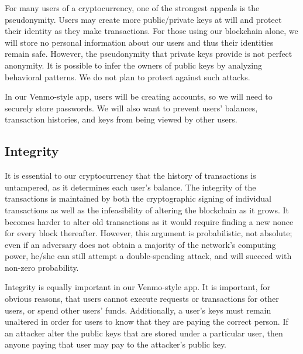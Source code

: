 \documentclass[12pt]{article}
\begin{document}
For many users of a cryptocurrency, one of the strongest appeals is the pseudonymity.
Users may create more public/private keys at will and protect their identity as they make transactions.
For those using our blockchain alone, we will store no personal information about our users and thus their identities remain safe.
However, the pseudonymity that private keys provide is not perfect anonymity. It is possible to infer the owners of public keys by analyzing behavioral patterns. We do not plan to protect against such attacks.

In our Venmo-style app, users will be creating accounts, so we will need to securely store passwords. We will also want to prevent users' balances, transaction histories, and keys from being viewed by other users.

\subsection{Integrity}

It is essential to our cryptocurrency that the history of transactions is untampered, as it determines each user's balance.
The integrity of the transactions is maintained by both the cryptographic signing of individual transactions as well as the infeasibility of altering the blockchain as it grows.
It becomes harder to alter old transactions as it would require finding a new nonce for every block thereafter.
However, this argument is probabilistic, not absolute; even if an adversary does not obtain a majority of the network's computing power, he/she can still attempt a double-spending attack, and will succeed with non-zero probability.

Integrity is equally important in our Venmo-style app.
It is important, for obvious reasons, that users cannot execute requests or transactions for other users, or spend other users' funds.
Additionally, a user's keys must remain unaltered in order for users to know that they are paying the correct person.
If an attacker alter the public keys that are stored under a particular user, then anyone paying that user may pay to the attacker's public key.
\end{document}
